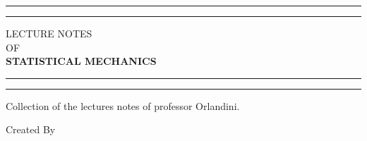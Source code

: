 \begin{titlepage} %

	\centering %
	
	\scshape %
	
	\vspace*{\baselineskip} %
	
	
	\rule{\textwidth}{1.6pt}\vspace*{-\baselineskip}\vspace*{2pt} %
	\rule{\textwidth}{0.4pt} %
	
	\vspace{0.75\baselineskip} %
	
	{\large LECTURE NOTES\\ OF\\ \LARGE \textbf{STATISTICAL MECHANICS}\\} %
	
	\vspace{0.75\baselineskip} %
	
	\rule{\textwidth}{0.4pt}\vspace*{-\baselineskip}\vspace{3.2pt} %
	\rule{\textwidth}{1.6pt} %
	
	\vspace{2\baselineskip} %
	
	
	Collection of the lectures notes of professor Orlandini. %
	
	\vspace*{3\baselineskip} %
	
	
	Created By
	
	\vspace{0.5\baselineskip} %
	

\end{titlepage}

